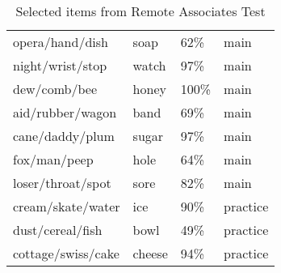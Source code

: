 \begin{table}[h!]
\begin{tabular}{llll}
		opera/hand/dish          & soap     & 62\%                                               & main    		\\ [0.5ex]
		night/wrist/stop         & watch    & 97\%                                               & main    		\\ [0.5ex]
		dew/comb/bee             & honey    & 100\%                                              & main    		\\ [0.5ex]
		aid/rubber/wagon         & band     & 69\%                                               & main    		\\ [0.5ex]
		cane/daddy/plum          & sugar    & 97\%                                               & main    		\\ [0.5ex]
		fox/man/peep             & hole     & 64\%                                               & main    		\\ [0.5ex]
		loser/throat/spot        & sore     & 82\%                                               & main    		\\ [0.5ex]
		cream/skate/water        & ice      & 90\%                                               & practice     \\ [0.5ex]
		dust/cereal/fish         & bowl     & 49\%                                               & practice     \\ [0.5ex]
		cottage/swiss/cake       & cheese   & 94\%                                               & practice     \\ \hline
	\end{tabular}
	\caption{Selected items from Remote Associates Test \cite{Bowden}}
	\label{table:1}
\end{table}